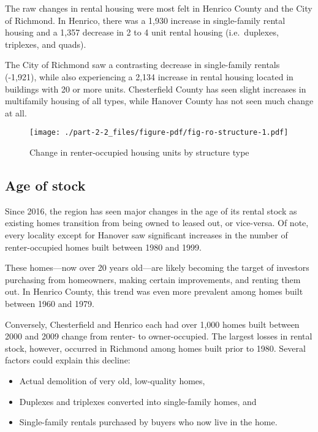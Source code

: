 \documentclass[
  letterpaper,
  DIV=11,
  numbers=noendperiod]{scrreprt}
\providecommand{\tightlist}{%
  \setlength{\itemsep}{0pt}\setlength{\parskip}{0pt}}\usepackage{longtable,booktabs,array}
\begin{document}
The raw changes in rental housing were most felt in Henrico County and
the City of Richmond. In Henrico, there was a 1,930 increase in
single-family rental housing and a 1,357 decrease in 2 to 4 unit rental
housing (i.e.~duplexes, triplexes, and quads).

The City of Richmond saw a contrasting decrease in single-family rentals
(-1,921), while also experiencing a 2,134 increase in rental housing
located in buildings with 20 or more units. Chesterfield County has seen
slight increases in multifamily housing of all types, while Hanover
County has not seen much change at all.

\begin{figure}

{\centering \texttt{[image: ./part-2-2\_files/figure-pdf/fig-ro-structure-1.pdf]}

}

\caption{\label{fig-ro-structure}Change in renter-occupied housing units
by structure type}

\end{figure}

\hypertarget{age-of-stock-1}{%
\subsection{Age of stock}\label{age-of-stock-1}}

Since 2016, the region has seen major changes in the age of its rental
stock as existing homes transition from being owned to leased out, or
vice-versa. Of note, every locality except for Hanover saw significant
increases in the number of renter-occupied homes built between 1980 and
1999.

These homes---now over 20 years old---are likely becoming the target of
investors purchasing from homeowners, making certain improvements, and
renting them out. In Henrico County, this trend was even more prevalent
among homes built between 1960 and 1979.

Conversely, Chesterfield and Henrico each had over 1,000 homes built
between 2000 and 2009 change from renter- to owner-occupied. The largest
losses in rental stock, however, occurred in Richmond among homes built
prior to 1980. Several factors could explain this decline:

\begin{itemize}
\tightlist
\item
  Actual demolition of very old, low-quality homes,
\item
  Duplexes and triplexes converted into single-family homes, and
\item
  Single-family rentals purchased by buyers who now live in the home.
\end{itemize}
\end{document}
